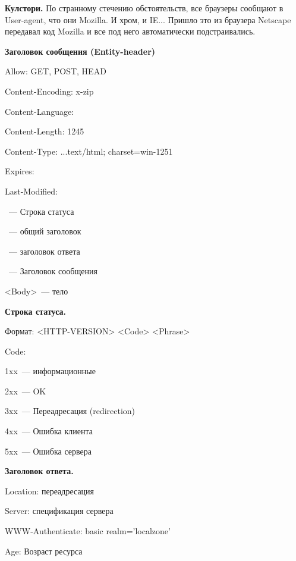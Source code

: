 {\bf Кулстори.} По странному стечению обстоятельств, все браузеры сообщают в User-agent, что они Mozilla. И хром, и IE... Пришло это из браузера Netscape передавал код Mozilla и все под него автоматически подстраивались.

{\bf Заголовок сообщения (Entity-header)}

\begin{MyItemize}
    \item Allow: GET, POST, HEAD
    \item Content-Encoding: x-zip
    \item Content-Language:
    \item Content-Length: 1245
    \item Content-Type: ...text/html; charset=win-1251
    \item Expires:
    \item Last-Modified:
\end{MyItemize}


\begin{MyItemize}
    \item <Status-line>~--- Строка статуса
    \item <General-header>~--- общий заголовок
    \item <Response-header>~--- заголовок ответа
    \item <Entity-header>~--- Заголовок сообщения
    \item <Body>~--- тело
\end{MyItemize}

{\bf Строка статуса.}

Формат: <HTTP-VERSION> <Code> <Phrase>

Code:
\begin{MyItemize}
    \item 1xx~--- информационные
    \item 2xx~--- OK
    \item 3xx~--- Переадресация (redirection)
    \item 4xx~--- Ошибка клиента
    \item 5xx~--- Ошибка сервера
\end{MyItemize}

{\bf Заголовок ответа.}
\begin{MyItemize}
    \item Location: переадресация
    \item Server: спецификация сервера
    \item WWW-Authenticate: basic realm=’localzone’
    \item Age: Возраст ресурса
\end{MyItemize}

